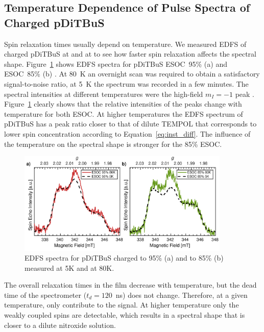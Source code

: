 \subsection{Temperature Dependence of Pulse Spectra of Charged pDiTBuS}
Spin relaxation times usually depend on temperature. We measured EDFS of charged pDiTBuS at  and at  to see how faster spin relaxation affects the spectral shape. Figure~\ref{fig:Figure_6} shows EDFS spectra for pDiTBuS  ESOC~95\% (a) and  ESOC~85\% (b) . At 80~K an overnight scan was required to obtain a satisfactory signal-to-noise ratio,  at 5~K the spectrum was recorded in a few minutes. The spectral intensities at different temperatures were   the high-field $m_I=-1$ peak . Figure~\ref{fig:Figure_6} clearly shows that the relative intensities of the peaks change with temperature for both ESOC. At higher temperatures the EDFS spectrum of pDiTBuS has a peak ratio closer to that of dilute TEMPOL that corresponds to  lower spin concentration\ik{,} according to Equation~\ref{eq:inst_diff}. The influence of the temperature  on the spectral shape is stronger for the  85\% ESOC.

\begin{figure}[ht]
\center
	\includegraphics[width=0.9\textwidth]{./pulse/figures/Figure_6.pdf}
	\caption{EDFS spectra for pDiTBuS charged to 95\% (a) and to 85\% (b) measured at 5K and at 80K.}
	\label{fig:Figure_6}
\end{figure}


The overall relaxation times in the film decrease with  temperature, but the dead time of the spectrometer ($t_d=120$~ns) does not change. Therefore, at a given temperature, only  contribute to the signal. At higher temperature only the weakly coupled spins  are detectable, which results in a spectral shape that is closer to a dilute nitroxide solution.\\

